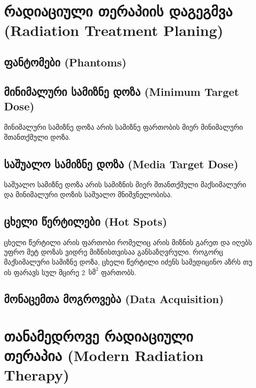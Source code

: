 \documentclass[12pt,a4paper,]{report}
\begin{document}
\section{რადიაციული თერაპიის დაგეგმვა (Radiation Treatment Planing)}
\subsection{ფანტომები (Phantoms)}

\subsection{მინიმალური სამიზნე დოზა (Minimum Target Dose)}
მინიმალური სამიზნე დოზა არის სამიზნე ფართობის მიერ მინიმალური შთანთქმული დოზა.

\subsection{საშუალო სამიზნე დოზა (Media Target Dose)}
საშუალო სამიზნე დოზა არის სამიზნის მიერ შთანთქმული მაქსიმალური და მინიმალური დოზის საშუალო მნიშვნელობისა.  

\subsection{ცხელი წერტილები (Hot Spots)}
ცხელი წერტილი არის ფართობი რომელიც არის მიზნის გარეთ და იღებს უფრო მეტ დოზას ვიდრე მიზნისთვისაა განსაზღვრული. როგორც მაქსიმალური სამიზნე დოზა, ცხელი წერტილი იძენს სამედიცინო აზრს თუ ის ფარავს სულ მცირე 2~$\text{სმ}^2$ ფართობს.

\subsection{მონაცემთა მოგროვება (Data Acquisition)}


\section{თანამედროვე რადიაციული თერაპია (Modern Radiation Therapy)}



\medskip

\end{document}
